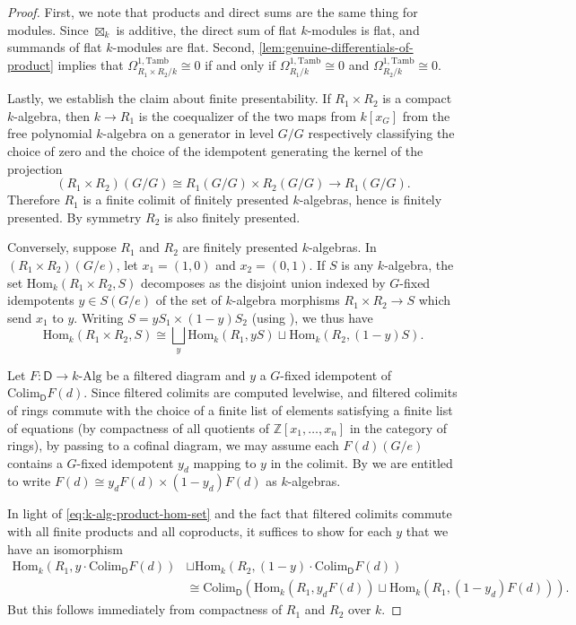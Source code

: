 \documentclass[11pt,dvipsnames]{amsart}
\newcommand{\Z}{\mathbb{Z}}
\theoremstyle{BoldRemark}
\newcommand{\Hom}{\mathrm{Hom}}
\newcommand{\colim}{\mathrm{Colim}}
\newcommand{\Alg}{\mathrm{Alg}}
\newcommand{\Tamb}{\mathrm{Tamb}}
\begin{document}
\begin{proof}
    First, we note that products and direct sums are the same thing for modules. Since $\boxtimes_k$ is additive, the direct sum of flat $k$-modules is flat, and summands of flat $k$-modules are flat. Second, \cref{lem:genuine-differentials-of-product} implies that $\Omega^{1,\Tamb}_{R_1 \times R_2/k} \cong 0$ if and only if $\Omega^{1,\Tamb}_{R_1/k} \cong 0$ and $\Omega^{1,\Tamb}_{R_2/k} \cong 0$.

    Lastly, we establish the claim about finite presentability. If $R_1 \times R_2$ is a compact $k$-algebra, then $k \rightarrow R_1$ is the coequalizer of the two maps from $k[x_G]$ from the free polynomial $k$-algebra on a generator in level $G/G$ respectively classifying the choice of zero and the choice of the idempotent generating the kernel of the projection 
    \[ 
        \left( R_1 \times R_2 \right)(G/G) \cong R_1(G/G) \times R_2(G/G) \rightarrow R_1(G/G) . 
    \] 
    Therefore $R_1$ is a finite colimit of finitely presented $k$-algebras, hence is finitely presented. By symmetry $R_2$ is also finitely presented.
	 
	Conversely, suppose $R_1$ and $R_2$ are finitely presented $k$-algebras. In $(R_1 \times R_2)(G/e)$, let $x_1 = (1,0)$ and $x_2 = (0,1)$. If $S$ is any $k$-algebra, the set $\Hom_k(R_1 \times R_2, S)$ decomposes as the disjoint union 
    indexed by $G$-fixed idempotents $y \in S(G/e)$ of the set of $k$-algebra morphisms $R_1 \times R_2 \rightarrow S$ which send $x_1$ to $y$. Writing $S = yS_1 \times (1-y)S_2$ (using \cite[Proposition 3.6]{Wis25a}), we thus have
    \begin{equation}\label{eq:k-alg-product-hom-set} 
        \Hom_k(R_1 \times R_2, S) \cong \bigsqcup_y \Hom_k(R_1,yS) \sqcup \Hom_k(R_2,(1-y)S) . 
    \end{equation}
    
    Let $F : \mathsf{D} \rightarrow k \text{-} \Alg$ be a filtered diagram and $y$ a $G$-fixed idempotent of $\colim_{\mathsf{D}} F(d)$. Since filtered colimits are computed levelwise, and filtered colimits of rings commute with the choice of a finite list of elements satisfying a finite list of equations (by compactness of all quotients of $\Z[x_1,\dots,x_n]$ in the category of rings), by passing to a cofinal diagram, we may assume each $F(d)(G/e)$ contains a $G$-fixed idempotent $y_d$ mapping to $y$ in the colimit. By \cite[Proposition 3.6]{Wis25a} we are entitled to write $F(d) \cong y_d F(d) \times (1-y_d) F(d)$ as $k$-algebras. 
    
    In light of \cref{eq:k-alg-product-hom-set} and the fact that filtered colimits commute with all finite products and all coproducts, it suffices to show for each $y$ that we have an isomorphism 
    \begin{align*} 
        \Hom_k(R_1, y \cdot \colim_{\mathsf{D}} F(d)) & \sqcup \Hom_k(R_2,(1-y) \cdot \colim_{\mathsf{D}} F(d)) \\ 
        & \cong \colim_{\mathsf{D}} ( \Hom_k(R_1,y_d F(d)) \sqcup \Hom_k(R_1,(1-y_d)F(d)) ) .
    \end{align*}
    But this follows immediately from compactness of $R_1$ and $R_2$ over $k$.
\end{proof}
\end{document}
